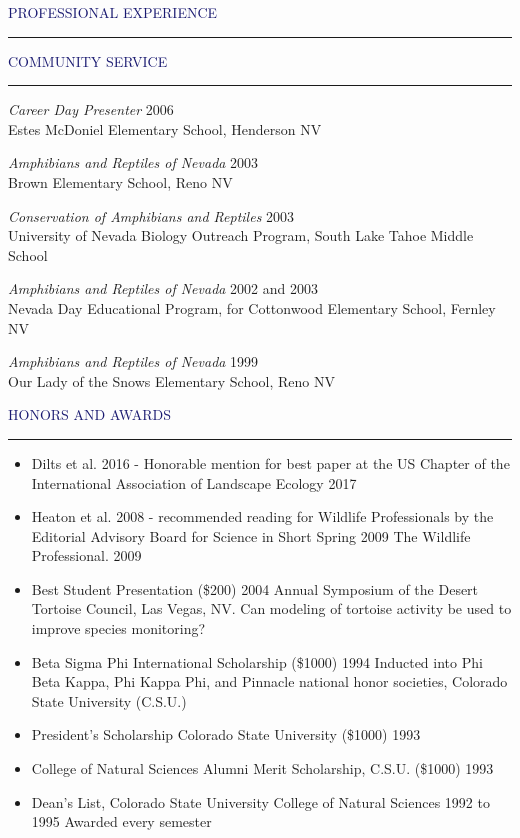\documentclass{resume} %
\renewenvironment{rSection}[1]{
\sectionskip
\textcolor{MidnightBlue}{\MakeUppercase{#1}}
\sectionlineskip
\hrule
\begin{list}{}{
\setlength{\leftmargin}{1.5em}
}
\item[]
}{
\end{list}
}
\begin{document}
\begin{rSection}{Professional Experience}
\begin{rSection}{Community Service}
\textit{Career Day Presenter} \hfill 2006 \\
Estes McDoniel Elementary School, Henderson NV

\textit{Amphibians and Reptiles of Nevada} \hfill 2003 \\
Brown Elementary School, Reno NV 

\textit{Conservation of Amphibians and Reptiles} \hfill 2003 \\
University of Nevada Biology Outreach Program, South Lake Tahoe Middle School

\textit{Amphibians and Reptiles of Nevada} \hfill 2002 and 2003 \\
Nevada Day Educational Program, for Cottonwood Elementary School, Fernley NV

\textit{Amphibians and Reptiles of Nevada} \hfill 1999 \\
Our Lady of the Snows Elementary School,  Reno NV\\
\end{rSection}

\begin{rSection}{Honors and Awards}{}
\begin{itemize}
\item Dilts et al. 2016 - Honorable mention for best paper at the US Chapter of the International Association of Landscape Ecology \hfill 2017
\item Heaton et al. 2008 -  recommended reading for Wildlife Professionals by the Editorial Advisory Board for Science in Short Spring 2009 The Wildlife Professional. \hfill 2009
\item Best Student Presentation (\$200) \hfill 2004
Annual Symposium of the Desert Tortoise Council, Las Vegas, NV. Can modeling of tortoise activity be used to improve species monitoring?
\item Beta Sigma Phi International Scholarship (\$1000) \hfill 1994 
Inducted into Phi Beta Kappa, Phi Kappa Phi, and Pinnacle national honor societies, Colorado State University (C.S.U.)
\item President's Scholarship Colorado State University (\$1000) \hfill 1993 
\item College of Natural Sciences Alumni Merit Scholarship, C.S.U. (\$1000) \hfill 1993 
\item Dean's List, Colorado State University College of Natural Sciences \hfill 1992 to 1995	
Awarded every semester
\end{itemize}


\end{rSection}
\end{rSection}
\end{document}
